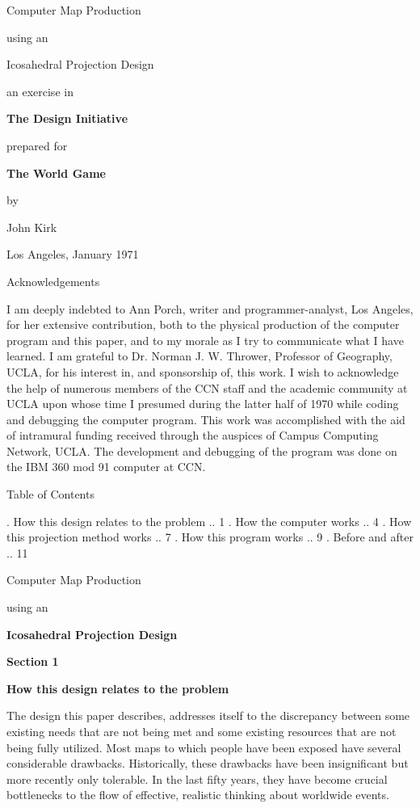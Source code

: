 
\nopagenumbers
\pageheight{8 in}
\pagewidth{5.5 in}
\hcorrection{+.5 in}
\scalefont \bf {} \andcallit \bighead
\centerline{\bighead Computer Map Production}
\bigskip\centerline{\bighead using an}
\bigskip\centerline{\bighead Icosahedral Projection Design}
\bigskip\bigskip
\centerline{an exercise in}
\centerline{\bf The Design Initiative}
\bigskip\centerline{prepared for}
\bigskip\centerline{\bf The World Game}
\bigskip\bigskip\centerline{by}
\medskip\centerline{John Kirk}
\medskip\centerline{Los Angeles, January 1971}
\vfill\eject
\centerline{Acknowledgements}
\bigskip\bigskip\flushpar
I am deeply indebted to Ann Porch, writer and programmer-analyst, Los Angeles,
for her extensive contribution,
both to the physical production of the computer program and this paper,
and to my morale as I try to communicate what I have learned.
\bigskip\flushpar
I am grateful to Dr. Norman J. W. Thrower, Professor of Geography, UCLA,
for his interest in, and sponsorship of, this work.
\bigskip\flushpar
I wish to acknowledge the help of numerous members of the CCN staff
and the academic community at UCLA
upon whose time I presumed during the latter half of 1970
while coding and debugging the computer program.
\bigskip\flushpar
This work was accomplished with the aid of intramural funding
received through the auspices of Campus Computing Network, UCLA.
The development and debugging of the program
was done on the IBM 360 mod 91 computer at CCN.
\vfill\eject
\centerline{\bighead Table of Contents}
\bigskip\bigskip
\bigskip{}. How this design relates to the problem .. 1
\bigskip{}. How the computer works .. 4
\bigskip{}. How this projection method works .. 7
\bigskip{}. How this program works .. 9
\bigskip{}. Before and after .. 11
\vfill\eject
\centerline{\bighead Computer Map Production}
\bigskip\centerline{using an}
\bigskip\centerline{\bf Icosahedral Projection Design}
\bigskip\bigskip\centerline{\bf Section 1}
\medskip\centerline{\bf How this design relates to the problem}
\bigskip\bigskip\flushpar
The design this paper describes, addresses itself
to the discrepancy between some existing needs that are
not being met and some existing resources that are not
being fully utilized.
\bigskip\flushpar
Most maps to which people have been exposed have
several considerable drawbacks.  Historically, these
drawbacks have been insignificant but more recently
only tolerable.  In the last fifty years, they have
become crucial bottlenecks to the flow of effective,
realistic thinking about worldwide events.
